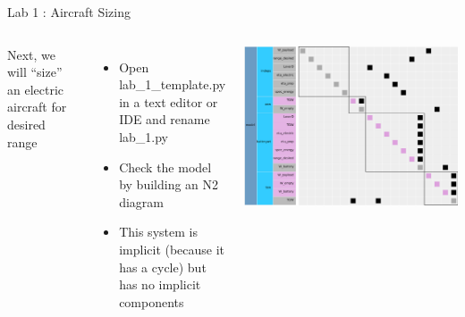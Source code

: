 \documentclass[aspectratio=169, usenames,dvipsnames, 14pt]{beamer}
\begin{document}

\begin{frame}{Lab 1 : Aircraft Sizing}
    \begin{columns}
            Next, we will “size” an electric aircraft for desired range
            \vspace{0.25cm}
            
            \begin{itemize}
                \item \footnotesize Open lab\_1\_template.py in a text editor or IDE and rename lab\_1.py
                \item \footnotesize Check the model by building an N2 diagram
                \item \footnotesize This system is implicit (because it has a cycle) but has no implicit components
            \end{itemize}

            \includegraphics[scale=0.25]{images/slide_65_image.PNG}
    \end{columns}
\end{frame}
    
\end{document}
